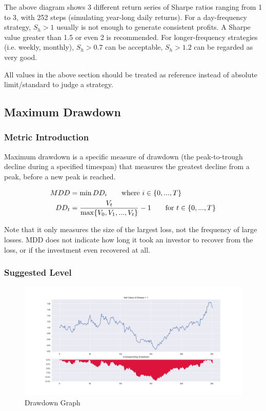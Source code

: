 \documentclass[12pt]{article}
\begin{document}
The above diagram shows 3 different return series of Sharpe ratios ranging from 1 to 3, with 252 steps (simulating year-long daily returns). For a day-frequency strategy, \(S_h > 1\) usually is not enough to generate consistent profits. A Sharpe value greater than 1.5 or even 2 is recommended. For longer-frequency strategies (i.e. weekly, monthly), \(S_h > 0.7\) can be acceptable, \(S_h > 1.2\) can be regarded as very good.

All values in the above section should be treated as reference instead of absolute limit/standard to judge a strategy.

\subsection{Maximum Drawdown}

\subsubsection*{Metric Introduction}

Maximum drawdown is a specific measure of drawdown (the peak-to-trough decline during a specified timespan) that measures the greatest decline from a peak, before a new peak is reached.

\begin{align*}
  MDD &= \min DD_i \tag*{where \(i \in {\{0, ..., T \}} \)} \\
  DD_t &= \frac{V_t}{\max \{V_0, V_1, ..., V_t \}}-1 \tag*{for \(t \in {\{0, ..., T \}} \)}
\end{align*}

Note that it only measures the size of the largest loss, not the frequency of large losses. MDD does not indicate how long it took an investor to recover from the loss, or if the investment even recovered at all.

\subsubsection*{Suggested Level}

\begin{figure}[h!]
  \centering
  \includegraphics[scale=0.39]{./ref/figure/drawdown_nav_600.png}
  \caption{Drawdown Graph}
  \label{fig:drawdown}
\end{figure}
\end{document}
